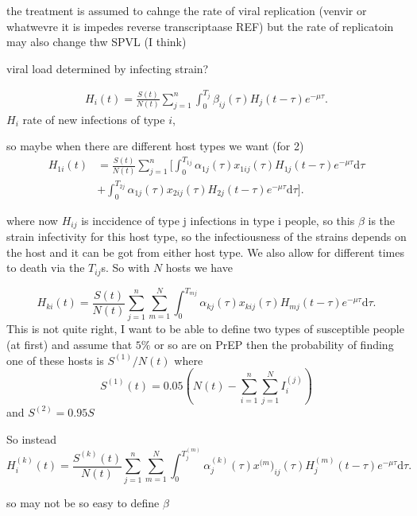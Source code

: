 \documentclass[twocolumn]{svjour3}          %
\begin{document}
the treatment is assumed to cahnge the rate of viral replication (venvir or whatwevre it is impedes reverse transcriptaase  REF)
but the rate of replicatoin may also  change thw SPVL (I think)
\cite{Williamson2015}

viral load determined by infecting strain?

\begin{gather*}
H_i(t) = \frac{S(t)}{N(t)}  \sum_{j=1}^n  \int_0^{T_j} \beta_{ij}(\tau) H_j(t-\tau)e^{-\mu \tau}.
\end{gather*}
$H_i$  rate of new infections of type $i$, 

so maybe when there are different host types we want (for 2)
\begin{align*}
H_{1i}(t) &= \frac{S(t)}{N(t)}  \sum_{j=1}^n  \bigg[ \int_0^{T_{1j}} \alpha_{1j}(\tau) x_{1ij}(\tau) H_{1j}(t-\tau)e^{-\mu \tau} \text{d}\tau  \\
&+  \int_0^{T_{2j}} 
\alpha_{1j}(\tau) x_{2ij}(\tau) H_{2j}(t-\tau)e^{-\mu \tau} \text{d}\tau  \bigg] .
\end{align*}

where now $H_{ij}$ is inccidence of type j infections in type i people, so this $\beta $ is the strain infectivity for this host type, so the infectiousness of the strains depends on the host and it can be got from either host type. We also  allow for different 
times to death via the $T_{ij}$s. So with $N$ hosts  we have 

\begin{equation*}
H_{ki}(t) = \frac{S(t)}{N(t)}  \sum_{j=1}^n \sum_{m=1}^N  \int_0^{T_{mj}} \alpha_{k j}(\tau) x_{kij}(\tau) H_{mj}(t-\tau)e^{-\mu \tau} \text{d}\tau.
\end{equation*}
This is not quite right, I want to  be able to define two types of susceptible people (at first) and assume that $5\%$ or so are on PrEP then the probability of finding one of these hosts is $S^{(1)} / N(t)$ where 
\begin{equation*}
S^{(1)}(t) = 0.05(N(t) - \sum_{i=1}^n \sum _{j=1}^N I^{(j)}_i)
\end{equation*}
 and $S^{(2)} = 0.95S$ 
 
 
 So  instead
\begin{equation*}
H^{(k)}_{i}(t) = \frac{S^{(k)}(t)}{N(t)}  \sum_{j=1}^n \sum_{m=1}^N  \int_0^{T^{(m)}_{j}} \alpha^{(k)}_{j}(\tau) x^{(m})_{ij}(\tau) H^{(m)}_{j}(t-\tau)e^{-\mu \tau} \text{d}\tau.
\end{equation*}

so may not be so easy to define $\beta$
\end{document}
